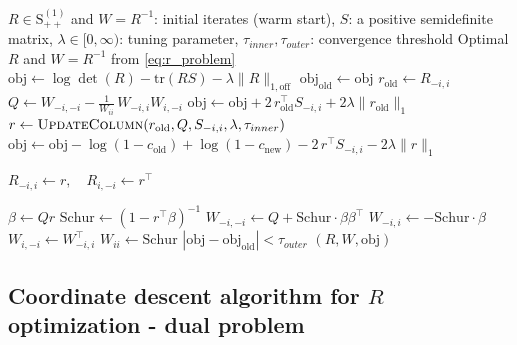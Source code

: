 \documentclass[12pt]{amsart}
\numberwithin{equation}{section}
\numberwithin{equation}{section}
\theoremstyle{plain}
\theoremstyle{definition}
\newcommand{\tr}{\mathrm{tr}}
\newcommand{\Sppone}{\mathrm{S}_{++}^{(1)}}
\begin{document}
\begin{algorithm}[H]
\caption{Coordinate Descent Algorithm for solving \eqref{eq:r_problem}}\label{alg:updateR}
\begin{algorithmic}[1]
\Require $R\in\Sppone$ and $W=R^{-1}$: initial iterates (warm start), $S$: a positive semidefinite matrix, $\lambda\in[0,\infty)$: tuning parameter, $\tau_{inner},\tau_{outer}$: convergence threshold
\Ensure Optimal $R$ and $W=R^{-1}$ from \eqref{eq:r_problem} 
    \State $\mathrm{obj} \gets \log\det(R) - \tr(RS) - \lambda \| R\|_{1,\mathrm{off}}$
    \Repeat
        \State $\mathrm{obj}_{\mathrm{old}} \gets \mathrm{obj}$
            \State $r_{\mathrm{old}} \gets R_{-i,i}$ 
            \State $Q \gets W_{-i,-i} - \frac{1}{W_{ii}}\, W_{-i,i} W_{i,-i}$ 
            \State $\mathrm{obj} \gets \mathrm{obj} + 2\, r_{\mathrm{old}}^\top S_{-i,i} + 2\lambda \|r_{\mathrm{old}}\|_1$
            \State $r \gets {\textsc{UpdateColumn}}(r_{\mathrm{old}}, Q, S_{-i,i}, \lambda, \tau_{inner})$
            \State $\mathrm{obj} \gets \mathrm{obj} - \log(1-c_{\mathrm{old}}) + \log(1-c_{\mathrm{new}})
                                    - 2\, r^\top S_{-i,i} - 2\lambda \|r\|_1$

            \State $R_{-i,i} \gets r,\quad R_{i,-i} \gets r^\top$ 

            \State $\beta \gets Q r$
            \State $\mathrm{Schur} \gets (1 - r^\top\beta)^{-1}$ 
            \State $W_{-i,-i} \gets Q + \mathrm{Schur}\cdot \beta\beta^\top$
            \State $W_{-i,i} \gets -\mathrm{Schur}\cdot \beta$
            \State $W_{i,-i} \gets W_{-i,i}^\top$
            \State $W_{ii} \gets \mathrm{Schur}$
        \EndFor
    \Until $|\mathrm{obj}-\mathrm{obj}_{\mathrm{old}}| < \tau_{outer}$
    \State \Return $(R,W,\mathrm{obj})$
\EndProcedure
\end{algorithmic}
\end{algorithm}


\subsection{Coordinate descent algorithm for \texorpdfstring{$R$}{R} optimization - dual problem}\label{sec:optRC}
\end{document}
